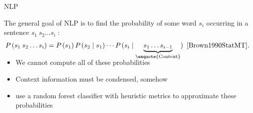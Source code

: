\begin{frame}{\acl{NLP}}
    \begin{definition}
        The general goal of \acs{NLP} is to find the probability of some word $s_i$
        occurring in a sentence $s_1\:s_2 \ldots s_i\;$:\vspace{-0.6ex}
        \begin{equation*}
            \P(s_1\:s_2 \ldots s_i)
                = \P(s_1) \P(s_2 \mid s_1)
                \cdots \P(s_i \mid
                    \smash[b]{\underbrace{s_1 \ldots s_{i-1}}_{\text{\enquote{Context}}}})
                \text{~\cite{Brown1990StatMT}.}
        \end{equation*}
        \vspace{-0.7ex}
    \end{definition}

    \pause %

    \begin{itemize}
        \setlength{\itemsep}{1ex}
        \item

        We cannot compute all of these probabilities

        \item

        Context information must be condensed, somehow

        \item

        \citeauthor*{Zhang2023RenamingPrediction} use a random forest classifier with
        heuristic metrics to approximate these
        probabilities~\cite{Zhang2023RenamingPrediction}

    \end{itemize}
\end{frame}

